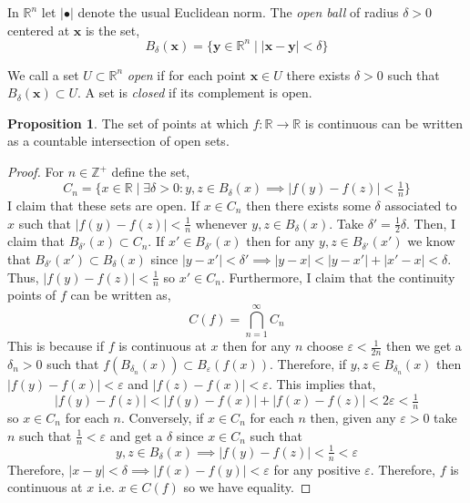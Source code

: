 \documentclass{article}
\newcommand{\Zplus}{\mathbb{Z}^{+}}
\newcommand{\ball}[2]{B_{#1} \! \left(#2 \right)}
\newcommand{\R}{\mathbb{R}}
\renewcommand{\bf}[1]{\mathbf{#1}}
\newenvironment{definition}[1][Definition:]{\begin{trivlist}
\item[\hskip \labelsep {\bfseries #1}]}{\end{trivlist}}
\theoremstyle{theorem}
\theoremstyle{definition}
\theoremstyle{definition}
\newtheorem*{proposition}{Proposition}
\theoremstyle{remark}
\theoremstyle{definition}
\theoremstyle{remark}
\begin{document}
\begin{definition}
In $\R^n$ let $|\bullet|$ denote the usual Euclidean norm. The \textit{open ball} of radius $\delta > 0$ centered at $\bf{x}$ is the set,
\[ \ball{\delta}{\bf{x}} = \{ \bf{y} \in \R^n \mid |\bf{x} -\bf{y}|  < \delta \}\]
\end{definition}

\begin{definition}
We call a set $U \subset \R^n$ \textit{open} if for each point $\bf{x} \in U$ there exists $\delta > 0$ such that $\ball{\delta}{\bf{x}} \subset U$. A set is \textit{closed} if its complement is open.  
\end{definition} 

\begin{proposition}
The set of points at which $f : \R \to \R$ is continuous can be written as a countable intersection of open sets. 
\end{proposition}

\begin{proof}
For $n \in \Zplus$ define the set,
\[ C_n = \{ x \in \R \mid \exists \delta > 0 : y,z \in \ball{\delta}{x} \implies |f(y) - f(z)| < \tfrac{1}{n} \} \]
I claim that these sets are open. If $x \in C_n$ then there exists some $\delta$ associated to $x$ such that $|f(y) - f(z)| < \frac{1}{n}$ whenever $y,z \in \ball{\delta}{x}$. Take $\delta' = \frac{1}{2} \delta$. Then, I claim that $\ball{\delta'}{x} \subset C_n$. If $x' \in \ball{\delta'}{x}$ then for any $y,z \in \ball{\delta'}{x'}$ we know that $\ball{\delta'}{x'} \subset \ball{\delta}{x}$ since $|y - x'| < \delta' \implies |y - x| < |y - x'| + |x' - x| < \delta$. Thus, $|f(y) - f(z)| < \frac{1}{n}$ so $x' \in C_n$. Furthermore, I claim that the continuity points of $f$ can be written as,
\[ C(f) = \bigcap_{n = 1}^{\infty} C_n \]
This is because if $f$ is continuous at $x$ then for any $n$ choose $\varepsilon < \frac{1}{2n}$ then we get a $\delta_n > 0$ such that $f(\ball{\delta_n}{x}) \subset \ball{\varepsilon}{f(x)}$. Therefore, if $y,z \in \ball{\delta_n}{x}$ then $|f(y) - f(x)| < \varepsilon$ and $|f(z) - f(x)| < \varepsilon$. This implies that,
\[ |f(y) - f(z)| < |f(y) - f(x)| + |f(x) - f(z)| < 2 \varepsilon < \tfrac{1}{n} \]
so $x \in C_n$ for each $n$. Conversely, if $x \in C_n$ for each $n$ then, given any $\varepsilon > 0$ take $n$ such that $\frac{1}{n} < \varepsilon$ and get a $\delta$ since $x \in C_n$ such that 
\[ y,z \in \ball{\delta}{x} \implies |f(y) - f(z)| < \tfrac{1}{n} < \varepsilon\]
Therefore, $|x - y| < \delta \implies |f(x) - f(y)| < \varepsilon$ for any positive $\varepsilon$. Therefore, $f$ is continuous at $x$ i.e. $x \in C(f)$ so we have equality. 
\end{proof}
\end{document}
